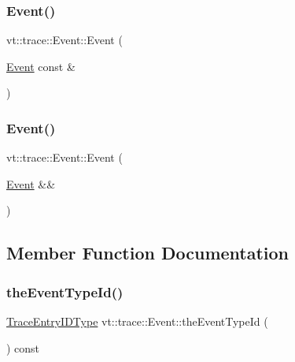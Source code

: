 \mbox{\label{structvt_1_1trace_1_1_event_a4c9c1f89d57a79f7b51f16fd31ae578a}} 
\subsubsection{\texorpdfstring{Event()}{Event()}\hspace{0.1cm}{\footnotesize\ttfamily [2/3]}}
{\footnotesize\ttfamily vt\+::trace\+::\+Event\+::\+Event (\begin{DoxyParamCaption}\item[{\hyperlink{structvt_1_1trace_1_1_event}{Event} const \&}]{ }\end{DoxyParamCaption})\hspace{0.3cm}{\ttfamily [default]}}

\mbox{\label{structvt_1_1trace_1_1_event_a286fcf42a1068659e4ce6429c604a8ec}} 
\subsubsection{\texorpdfstring{Event()}{Event()}\hspace{0.1cm}{\footnotesize\ttfamily [3/3]}}
{\footnotesize\ttfamily vt\+::trace\+::\+Event\+::\+Event (\begin{DoxyParamCaption}\item[{\hyperlink{structvt_1_1trace_1_1_event}{Event} \&\&}]{ }\end{DoxyParamCaption})\hspace{0.3cm}{\ttfamily [default]}}



\subsection{Member Function Documentation}
\mbox{\label{structvt_1_1trace_1_1_event_aa977fc8868e6807f1bcf1df8bdc15588}} 
\subsubsection{\texorpdfstring{the\+Event\+Type\+Id()}{theEventTypeId()}}
{\footnotesize\ttfamily \hyperlink{namespacevt_1_1trace_a3c14050715ba9eceaeff51fb3de64f2f}{Trace\+Entry\+I\+D\+Type} vt\+::trace\+::\+Event\+::the\+Event\+Type\+Id (\begin{DoxyParamCaption}{ }\end{DoxyParamCaption}) const}

